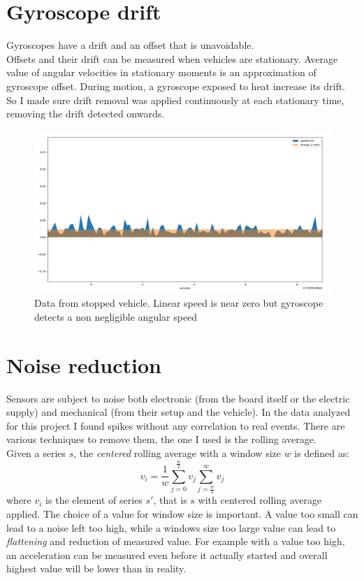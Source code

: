 \section{Gyroscope drift}
Gyroscopes have a drift and an offset that is unavoidable. \cite{6727722} \\
Offsets and their drift can be measured when vehicles are stationary. Average value of angular velocities in stationary moments is an approximation of gyroscope offset.
During motion, a gyroscope exposed to heat increase its drift. So I made sure drift removal was applied continuously at each stationary time, removing the drift detected onwards. 
\begin{figure}[H]
\includegraphics[width=\textwidth]{gyro_drift.png}
\caption{Data from stopped vehicle. Linear speed is near zero but gyroscope detects a non negligible angular speed}
\end{figure}

\section{Noise reduction}
Sensors are subject to noise both electronic (from the board itself or the electric supply) and mechanical (from their setup and the vehicle). In the data analyzed for this project I found spikes without any correlation to real events.
There are various techniques to remove them, the one I used is the rolling average. \\ %
Given a series $s$, the \textit{centered} rolling average with a window size $w$ is defined as:
$$ v_i = \frac{1}{w} \sum_{j=0}^{\frac{w}{2}}v_j \sum_{j=\frac{w}{2}}^{w}v_j $$
where $v_i$ is the element of series $s'$, that is $s$ with centered rolling average applied.
The choice of a value for window size is important. A value too small can lead to a noise left too high, while a windows size too large value can lead to \textit{flattening} and reduction of measured value. For example with a value too high, an acceleration can be measured even before it actually started and overall highest value will be lower than in reality.

